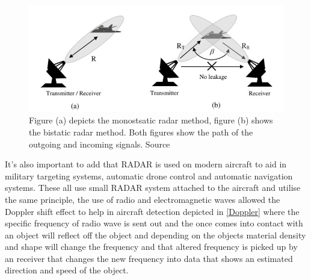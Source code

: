 \documentclass[12pt]{article}
\begin{document}
\begin{figure}[H]
\centering
\includegraphics[scale=0.6]{Images/Radar-Systems-a-Monostatic-Radar-b-Bistatic-Radar.png}
\caption{Figure (a) depicts the monostsatic radar method, figure (b) shows the bistatic radar method. Both figures show the path of the outgoing and incoming signals. Source \cite{RadarImage1}}
\label{Radardiagram}
\end{figure}

It's also important to add that RADAR is used on modern aircraft to aid in military targeting systems, automatic drone control and automatic navigation systems. These all use small RADAR system attached to the aircraft and utilise the same principle, the use of radio and electromagnetic waves allowed the Doppler shift effect to help in aircraft detection depicted in \cref{Doppler} where the specific frequency of radio wave is sent out and the once comes into contact with an object will reflect off the object and depending on the objects material density and shape will change the frequency and that altered frequency is picked up by an receiver that changes the new frequency into data that shows an estimated direction and speed of the object.
\end{document}
